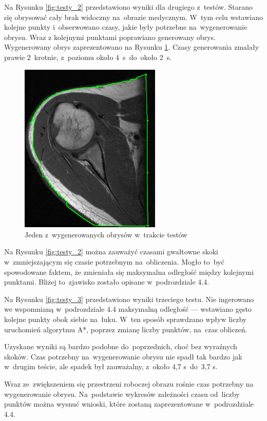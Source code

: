 \documentclass[a4paper,11pt,twoside,openright]{report}
\theoremstyle{definition}
\begin{document}
Na Rysunku \ref{fig:testy_2} przedstawiono wyniki dla drugiego z~testów. Starano
się obrysować cały brak widoczny na~obrazie medycznym. W~tym celu wstawiano kolejne
punkty i~obserwowano czasy, jakie były potrzebne na~wygenerowanie obrysu. Wraz z
kolejnymi punktami poprawiano generowany obrys. Wygenerowany obrys zaprezentowano
na Rysunku \ref{fig:108}. Czasy generowania zmalały prawie 2~krotnie, z~poziomu
około 4~s~do~około 2~s.

\begin{figure}[h!]
	\center
	\includegraphics[width=0.6\textwidth]{108}
	\caption{Jeden z~wygenerowanych obrysów w~trakcie testów}
    	\label{fig:108}
\end{figure}


Na Rysunku \ref{fig:testy_2} można zauważyć czasami gwałtowne skoki w~zmniejszającym
się czasie potrzebnym na~obliczenia. Mogło to~być spowodowane faktem, że zmieniała
się maksymalna odległość między kolejnymi punktami. Bliżej to~zjawisko zostało
opisane w~podrozdziale 4.4.

Na Rysunku \ref{fig:testy_3} przedstawiono wyniki trzeciego testu. Nie ingerowano
we wspomnianą w~podrozdziale 4.4 maksymalną odległość --- wstawiano gęsto kolejne
punkty obok siebie na~łuku. W~ten sposób sprawdzano wpływ liczby uruchomień
algorytmu A*, poprzez zmianę liczby punktów, na~czas obliczeń.

Uzyskane wyniki są bardzo podobne do~poprzednich, choć bez wyraźnych skoków.
Czas potrzebny na~wygenerowanie obrysu nie spadł tak bardzo jak w~drugim teście,
ale spadek był zauważalny, z~około 4,7 s~do~3,7 s.

Wraz ze~zwiększeniem się przestrzeni roboczej obrazu rośnie czas potrzebny na
wygenerowanie obrysu. Na~podstawie wykresów zależności czasu od~liczby punktów
można wysnuć wnioski, które zostaną zaprezentowane w~podrozdziale 4.4.
\end{document}
